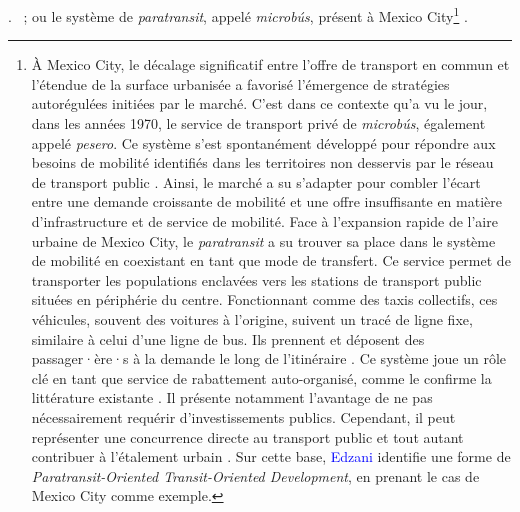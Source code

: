 \begin{refsegment}
{\textcolor{blue}{\autocite[11]{currie_bus_2006}}.
}~; ou le système de \textsl{paratransit}, appelé \textit{microbús}, présent à Mexico City\footnote{
    À Mexico City, le décalage significatif entre l’offre de transport en commun et l’étendue de la surface urbanisée a favorisé l’émergence de stratégies autorégulées initiées par le marché. C’est dans ce contexte qu’a vu le jour, dans les années 1970, le service de transport privé de \textsl{microbús}, également appelé \textsl{pesero}. Ce système s’est spontanément développé pour répondre aux besoins de mobilité identifiés dans les territoires non desservis par le réseau de transport public \textcolor{blue}{\autocite[p.~379-399 (chapitre 15)]{cervero_transit_1998}}. Ainsi, le marché a su s’adapter pour combler l’écart entre une demande croissante de mobilité et une offre insuffisante en matière d'infrastructure et de service de mobilité. Face à l’expansion rapide de l’aire urbaine de Mexico City, le \textsl{paratransit} a su trouver sa place dans le système de mobilité en coexistant en tant que mode de transfert. Ce service permet de transporter les populations enclavées vers les stations de transport public situées en périphérie du centre. Fonctionnant comme des taxis collectifs, ces véhicules, souvent des voitures à l’origine, suivent un tracé de ligne fixe, similaire à celui d’une ligne de bus. Ils prennent et déposent des passager·ère·s à la demande le long de l'\gls{itinéraire} \textcolor{blue}{\autocite[4]{chiu_does_2022}}. Ce système  joue un rôle clé en tant que service de rabattement auto-organisé, comme le confirme la littérature existante \textcolor{blue}{\autocite[98, 246]{adjeroud_coexistence_2024}}. Il présente notamment l'avantage de ne pas nécessairement requérir d'investissements publics. Cependant, il peut représenter une concurrence directe au transport public  et tout autant contribuer à l’étalement urbain \textcolor{blue}{\autocite[4]{chiu_does_2022}}. Sur cette base, \textcolor{blue}{Edzani} \textcolor{blue}{\textcite[65]{libunyu_paratransit-oriented_2024}} identifie une forme de \textsl{Paratransit-Oriented Transit-Oriented Development}, en prenant le cas de Mexico City comme exemple.
} \textcolor{blue}{\autocite[343-399]{cervero_transit_1998}}.%


\end{refsegment}
